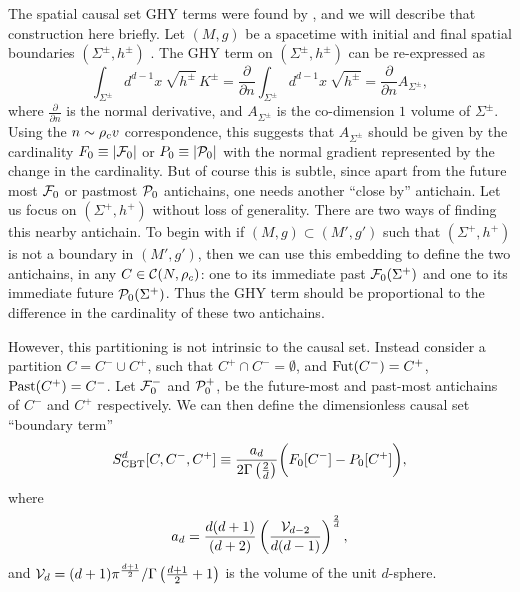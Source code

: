 The spatial causal set GHY  terms were found by \cite{bdjs}, and we will describe that construction here briefly. Let
$(M,g)$ be a spacetime with initial and final spatial boundaries $(\Sigma^\pm,h^\pm)$ .  The GHY term on $(\Sigma^\pm,h^\pm)$ can be re-expressed as
\begin{equation} 
\int_{\Sigma^\pm} d^{d-1}x\: \sqrt{h^\pm}\, K^\pm= \frac{\partial}{\partial n}\int_{\Sigma^\pm} d^{d-1}x\: \sqrt{h^\pm}
=\frac{\partial}{\partial n} A_{\Sigma^\pm},
\label{eq:GHYterm}
\end{equation} 
where $\frac{\partial}{\partial n}$ is the normal derivative, and $A_{\Sigma^\pm}$ is the co-dimension $1$ volume of $\Sigma^\pm$. 
Using  the $n\sim \rho_c v$ correspondence, this suggests that $A_{\Sigma^\pm}$ should be  given by the cardinality 
$F_{0}\equiv |\mathcal F_0|$ or $P_{0}\equiv |\mathcal P_0|$ with the normal gradient represented by the  change in the
cardinality.  But of course this is subtle, 
since  apart from the future most $\mathcal F_0$ or pastmost $\mathcal P_0$ antichains, one needs  another ``close by'' antichain.
Let us focus on $(\Sigma^+,h^+)$ without loss of generality. There are two  ways of finding
this nearby antichain. To begin with if $(M,g) \subset (M',g')$ such that $(\Sigma^+,h^+)$ is not
a boundary in $(M',g')$, then we can use this embedding  to define the two antichains, in any $C \in \mathcal C(N,\rho_c)$: one to
its immediate past $\mathcal F_0(\Sigma^+)$ and one
to its immediate future $\mathcal P_0(\Sigma^+)$. Thus the GHY term should be proportional to the difference in the cardinality of these two
antichains.  

However, this partitioning is not intrinsic to the causal set. Instead consider a partition  $C = C^-\cup C^+$, such that $C^+\cap C^-=\emptyset$, and $\mathrm{Fut}(C^-)=C^+$, $\mathrm{Past}(C^+)=C^-$. 
Let $\mathcal F_0^-$ and $\mathcal P_0^+$, be the
future-most and past-most antichains of $C^-$ and $C^+$ respectively.  We can then define the  
dimensionless causal set ``boundary term'' \citep{bdjs}
\begin{equation} 
S_{\rm CBT}^d[C,C^-,C^+] \equiv \frac{a_d}{2 \Gamma\left(\frac{2}{d}\right)}\biggl( F_{0}[C^-]-P_{0}[C^+]\biggr),  
\label{eq:cbt} 
\end{equation} 
where
\begin{equation} 
\label{eq:Cn}
a_{d}=\frac{d (d+1)}{(d+2)}\left(\frac{\mathcal{V}_{d-2}}{d(d-1)}\right)^{\frac{2}{d}},
\end{equation} 
and $\mathcal{V}_d=(d+1)\pi^{\frac{d+1}{2}}/\Gamma\left (\frac{d+1}{2}+1\right)$ is the volume of the unit $d$-sphere.



